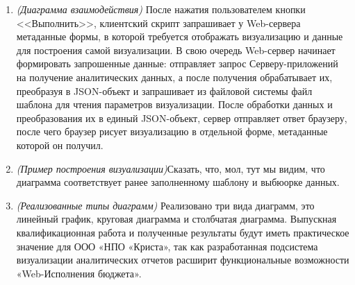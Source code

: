 \documentclass[a4paper]{extarticle}
\begin{document}
\begin{enumerate}[label=\textbf{\arabic*})]
	\item \textit{(Диаграмма взаимодействия)} После нажатия пользователем кнопки <<Выполнить>>, клиентский скрипт запрашивает у Web-сервера метаданные формы, в которой требуется отображать визуализацию и данные для построения самой визуализации. В свою очередь Web-сервер начинает формировать запрошенные данные: отправляет запрос Серверу-приложений на получение аналитических данных, а после получения обрабатывает их, преобразуя в JSON-объект и запрашивает из файловой системы файл шаблона для чтения параметров визуализации. После обработки данных и преобразования их в единый JSON-объект, сервер отправляет ответ браузеру, после чего браузер рисует визуализацию в отдельной форме, метаданные которой он получил.
	\item \textit{(Пример построения визуализации)}Сказать, что, мол, тут мы видим, что диаграмма соответствует ранее заполненному шаблону и выбюорке данных.
	\item \textit{(Реализованные типы диаграмм)} Реализовано три вида диаграмм, это линейный график, круговая диаграмма и столбчатая диаграмма. Выпускная квалификационная работа и полученные результаты будут иметь практическое значение для ООО «НПО «Криста», так как разработанная подсистема визуализации аналитических отчетов расширит функциональные возможности «Web-Исполнения бюджета».
\end{enumerate}
\end{document}
